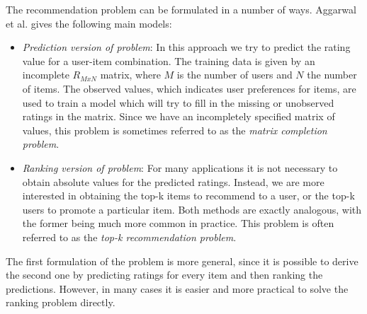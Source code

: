 \documentclass[cic,tc,english]{iiufrgs}
\begin{document}
The recommendation problem can be formulated in a number of ways. Aggarwal et al. \cite{Aggarwal2016} gives the following main models:
\begin{itemize}
\item \emph{Prediction version of problem}: In this approach we try to predict the rating value for a user-item combination. The training data is given by an incomplete $R_{MxN}$ matrix, where $M$ is the number of users and $N$ the number of items. The observed values, which indicates user preferences for items, are used to train a model which will try to fill in the missing or unobserved ratings in the matrix. Since we have an incompletely specified matrix of values, this problem is sometimes referred to as the \textit{matrix completion problem}.
\item \emph{Ranking version of problem}: For many applications it is not necessary to obtain absolute values for the predicted ratings. Instead, we are more interested in obtaining the top-k items to recommend to a user, or the top-k users to promote a particular item. Both methods are exactly analogous, with the former being much more common in practice. This problem is often referred to as the \textit{top-k recommendation problem}.
\end{itemize}

The first formulation of the problem is more general, since it is possible to derive the second one by predicting ratings for every item and then ranking the predictions. However, in many cases it is easier and more practical to solve the ranking problem directly.
\end{document}
